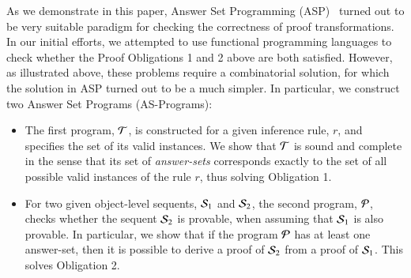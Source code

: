 \documentclass{new_tlp}
\begin{document}
As we demonstrate in this paper, Answer Set Programming (ASP)~\cite{gelfond90iclp} turned out to be very suitable
paradigm for checking the correctness of proof transformations. In our initial efforts, 
we attempted to use functional programming languages to check whether the Proof Obligations 1 and 2 
above are both satisfied. However, as illustrated above, these problems require a combinatorial
solution, for which the solution in ASP turned out to be a much simpler. In particular, we construct two Answer Set Programs 
(AS-Programs):
\begin{itemize}
 \item The first program, $\Tscr$, is constructed for a given inference
rule, $r$, and specifies the set of its valid instances. 
We show that $\Tscr$ is sound and complete in the sense
that its set of \emph{answer-sets} corresponds 
exactly to the set of all possible valid instances of the rule $r$, thus 
solving Obligation 1.

\item For two given object-level sequents, $\Sscr_1$ and $\Sscr_2$, the
second program, $\Pscr$, checks whether the sequent $\Sscr_2$ is provable,
when assuming that $\Sscr_1$ is also provable. In particular, we show that
if the program $\Pscr$ has at least one answer-set, then it is
possible to derive a proof of $\Sscr_2$ from a proof of $\Sscr_1$. This 
solves Obligation 2.
\end{itemize}
\end{document}
